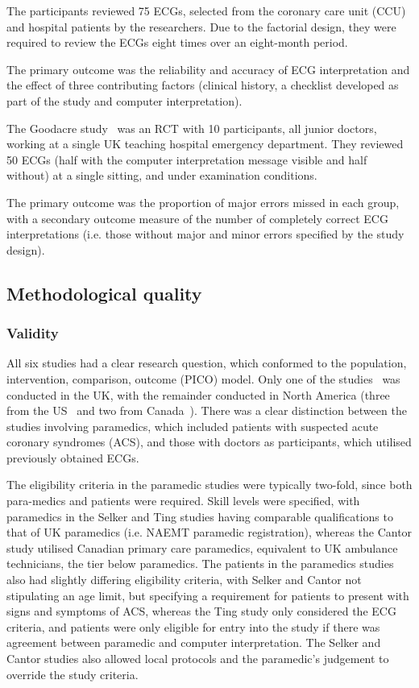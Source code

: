 The participants reviewed 75 ECGs, selected from the coronary care unit (CCU) and hospital patients by the researchers. Due to the factorial design, they were required to review the ECGs eight times over an eight-month period.

The primary outcome was the reliability and accuracy of ECG interpretation and the effect of three contributing factors (clinical history, a checklist developed as part of the study and computer interpretation).

The Goodacre study~\citep{goodacre_computer_2001} was an RCT with 10 participants, all junior doctors, working at a single UK teaching hospital emergency department. They reviewed 50 ECGs (half with the computer interpretation message visible and half without) at a single sitting, and under examination conditions.

The primary outcome was the proportion of major errors missed in each group, with a secondary outcome measure of the number of completely correct ECG interpretations (i.e. those without major and minor errors specified by the study design). 

\subsection{Methodological quality}
\label{methodologicalquality}

\subsubsection{Validity}
\label{validity}

All six studies had a clear research question, which conformed to the population, intervention, comparison, outcome (PICO) model. Only one of the studies~\citep{goodacre_computer_2001} was conducted in the UK, with the remainder conducted in North America (three from the US~\citep{tsai_computer_2003,ting_abstract_2009,selker_emergency_2011} and two from Canada~\citep{massel_observer_2003,cantor_prehospital_2012}). There was a clear distinction between the studies involving paramedics, which included patients with suspected acute coronary syndromes (ACS), and those with doctors as participants, which utilised previously obtained ECGs.

The eligibility criteria in the paramedic studies were typically two-fold, since both para-medics and patients were required. Skill levels were specified, with paramedics in the Selker and Ting studies having comparable qualifications to that of UK paramedics (i.e. NAEMT paramedic registration), whereas the Cantor study utilised Canadian primary care paramedics, equivalent to UK ambulance technicians, the tier below paramedics. The patients in the paramedics studies also had slightly differing eligibility criteria, with Selker and Cantor not stipulating an age limit, but specifying a requirement for patients to present with signs and symptoms of ACS, whereas the Ting study only considered the ECG criteria, and patients were only eligible for entry into the study if there was agreement between paramedic and computer interpretation. The Selker and Cantor studies also allowed local protocols and the paramedic's judgement to override the study criteria. 

